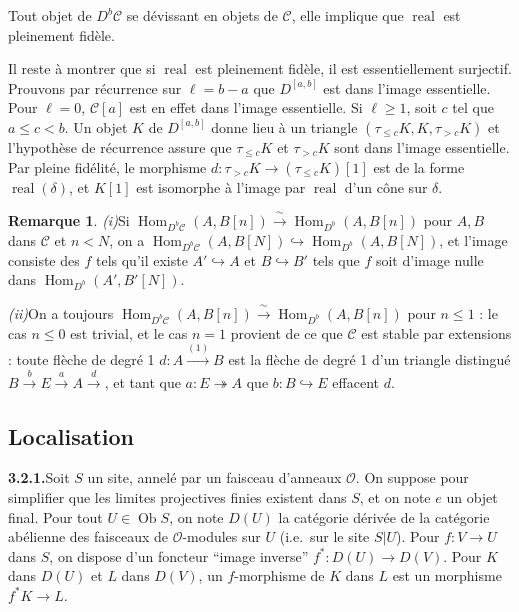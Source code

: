 \documentclass[12pt,a4paper]{article}
\theoremstyle{plain}
\theoremstyle{definition}
\newtheorem{remark}[theorem]{Remarque}
\DeclareMathOperator{\Hom}{Hom}
\DeclareMathOperator{\real}{real}
\DeclareMathOperator{\Ob}{Ob}
\begin{document}
Tout objet de $D^b\mathcal{C}$ se d\'evissant en objets de $\mathcal{C}$, elle implique que $\real$ est pleinement fid\`ele.

Il reste \`a montrer que si $\real$ est pleinement fid\`ele, il est essentiellement surjectif. Prouvons par r\'ecurrence sur $\ell = b-a$ que $D^{[a,b]}$ est dans l'image essentielle. Pour $\ell = 0$, $\mathcal{C}[a]$ est en effet dans l'image essentielle. Si $\ell \geqslant 1$, soit $c$ tel que $a \leqslant c < b$. Un objet $K$ de $D^{[a,b]}$ donne lieu \`a un triangle $(\tau_{\leqslant c} K, K, \tau_{> c} K)$ et l'hypoth\`ese de r\'ecurrence assure que $\tau_{\leqslant c} K$ et $\tau_{> c} K$ sont dans l'image essentielle. Par pleine fid\'elit\'e, le morphisme $d : \tau_{> c} K \to (\tau_{\leqslant c} K)[1]$ est de la forme $\real(\delta)$, et $K[1]$ est isomorphe \`a l'image par $\real$ d'un c\^one sur $\delta$.

\begin{remark}\label{rem:3.1.12}
\emph{(i)}\quad Si $\Hom_{D^b\mathcal{C}}(A, B[n]) \xrightarrow{\;\sim\;} \Hom_{D^b}(A, B[n])$ pour $A, B$ dans $\mathcal{C}$ et $n < N$, on a $\Hom_{D^b\mathcal{C}}(A, B[N]) \hookrightarrow \Hom_{D^b}(A, B[N])$, et l'image consiste des $f$ tels qu'il existe $A' \hookrightarrow A$ et $B \hookrightarrow B'$ tels que $f$ soit d'image nulle dans $\Hom_{D^b}(A', B'[N])$.

\emph{(ii)}\quad On a toujours $\Hom_{D^b\mathcal{C}}(A, B[n]) \xrightarrow{\;\sim\;} \Hom_{D^b}(A, B[n])$ pour $n \leqslant 1$ : le cas $n \leqslant 0$ est trivial, et le cas $n = 1$ provient de ce que $\mathcal{C}$ est stable par extensions : toute fl\`eche de degr\'e 1 $d : A \xrightarrow{(1)} B$ est la fl\`eche de degr\'e 1 d'un triangle distingu\'e $B \xrightarrow{b} E \xrightarrow{a} A \xrightarrow{d}$, et tant que $a : E \twoheadrightarrow A$ que $b : B \hookrightarrow E$ effacent $d$.
\end{remark}

\subsection{Localisation}

\noindent\textbf{3.2.1.}\quad Soit $S$ un site, annel\'e par un faisceau d'anneaux $\mathcal{O}$. On suppose pour simplifier que les limites projectives finies existent dans $S$, et on note $e$ un objet final. Pour tout $U \in \Ob S$, on note $D(U)$ la cat\'egorie d\'eriv\'ee de la cat\'egorie ab\'elienne des faisceaux de $\mathcal{O}$-modules sur $U$ (i.e.\ sur le site $S|U$). Pour $f : V \to U$ dans $S$, on dispose d'un foncteur ``image inverse'' $f^* : D(U) \to D(V)$. Pour $K$ dans $D(U)$ et $L$ dans $D(V)$, un $f$-morphisme de $K$ dans $L$ est un morphisme $f^* K \to L$.
\end{document}
